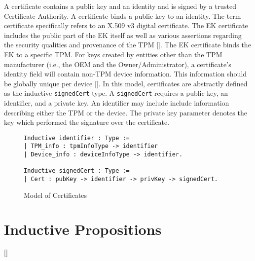 A certificate contains a public key and an identity and is signed by a trusted Certificate Authority. A certificate binds a public key to an identity. The term certificate specifically refers to an X.509 v3 digital certificate. 
The EK certificate includes the public part of the EK itself as well as various assertions regarding the security qualities and provenance of the TPM [\cite{EKSpec}]. The EK certificate binds the EK to a specific TPM. For keys created by entities other than the TPM manufacturer (i.e., the OEM and the Owner/Administrator), a certificate's identity field will contain non-TPM device information. This information should be globally unique per device [\cite{DevIDSpec-IEEE}]. In this model, certificates are abstractly defined as the inductive \verb|signedCert| type. A \verb|signedCert| requires a public key, an identifier, and a private key. An identifier may include include information describing either the TPM or the device. The private key parameter denotes the key which performed the signature over the certificate.
\begin{figure}[h]
\begin{lstlisting}[language=Coq]
Inductive identifier : Type :=
| TPM_info : tpmInfoType -> identifier
| Device_info : deviceInfoType -> identifier.

Inductive signedCert : Type :=
| Cert : pubKey -> identifier -> privKey -> signedCert.
\end{lstlisting}
\caption{Model of Certificates}
\end{figure}





\section{Inductive Propositions}


[\cite{LogicalFoundations}]